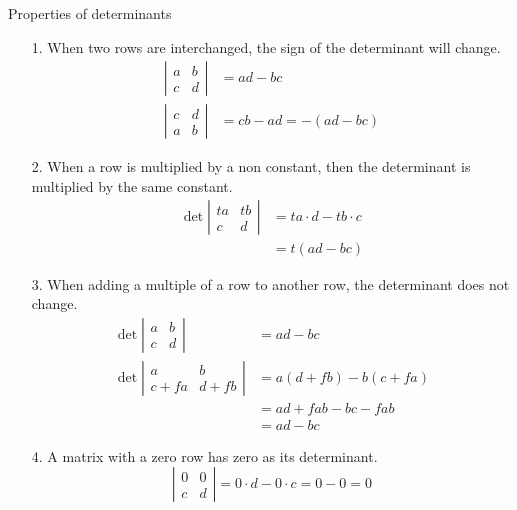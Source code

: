 \documentclass[main.tex]{subfiles}
\begin{document}
Properties of determinants
\begin{enumerate}
    \item [1.] When two rows are interchanged, the sign of the determinant will change. 
    $$
    \begin{aligned}
    \left|\begin{array}{ll}
    a & b \\
    c & d
    \end{array}\right| &= a d-b c \\
    \left|\begin{array}{ll}
    c & d \\
    a & b
    \end{array}\right| &= c b-a d=-(a d-b c)
    \end{aligned}
    $$

    \item [2.] When a row is multiplied by a non constant, then the determinant is multiplied by the same constant.
    $$
    \begin{aligned}
    \operatorname{det}\left|\begin{array}{cc}t a & tb \\ c & d\end{array}\right| &= t a \cdot d - tb\cdot c\\
    &= t(a d-b c)
    \end{aligned}
    $$
    
    \item [3.] When adding a multiple of a row to another row, the determinant does not change.
    $$
    \begin{aligned}
    \operatorname{det}\left|\begin{array}{ll}
    a & b \\
    c & d
    \end{array}\right|&=a d-b c\\
    \operatorname{det}\left|\begin{array}{cc}
    a & b \\
    c+fa & d+fb
    \end{array}\right| &= a(d+fb)-b(c+fa) \\
    &= ad + fab - bc - fab \\
    &= ad - bc
    \end{aligned}
    $$
    
    \item[4.] A matrix with a zero row has zero as its determinant.
    $$
    \left|\begin{array}{ll}
    0 & 0 \\
    c & d
    \end{array}\right|=0 \cdot d-0 \cdot c=0-0=0
    $$
    

\end{enumerate}
\end{document}
